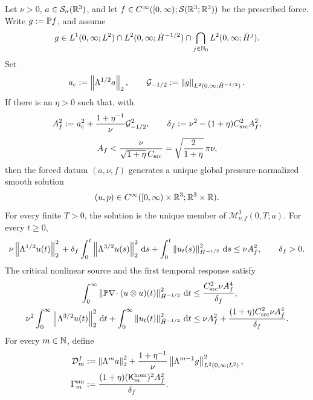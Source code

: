 \begin{theorem}
\label{f:thm:app-small-critical-global}
Let \(\nu>0\), \(a\in\mathcal S_\sigma(\mathbb R^3)\), and let
\(f\in C^\infty([0,\infty);\mathcal S(\mathbb R^3;\mathbb R^3))\) be the prescribed
force.  Write \(g:=\mathbb P f\), and assume
\begin{equation}
 g\in L^1(0,\infty;L^2)
 \cap L^2(0,\infty;\dot H^{-1/2})
 \cap\bigcap_{j\in\mathbb N_0}L^2(0,\infty;\dot H^j).
 \label{f:eq:app-small-force-class}
\end{equation}
Set
\[
 a_{\rm c}:=\left\lVert \Lambda^{1/2}a\right\rVert_2,
 \qquad
 \mathcal G_{-1/2}:=\left\lVert g\right\rVert_{L^2(0,\infty;\dot H^{-1/2})}.
\]
If there is an \(\eta>0\) such that, with
\[
 A_f^2:=a_{\rm c}^2
 +\frac{1+\eta^{-1}}{\nu}\mathcal G_{-1/2}^2,
 \qquad
 \delta_f:=\nu^2-(1+\eta)C_{\rm src}^2A_f^2,
\]
\begin{equation}
 A_f<\frac{\nu}{\sqrt{1+\eta}\,C_{\rm src}}
 =\sqrt{\frac{2}{1+\eta}}\,\pi\nu,
 \label{f:eq:app-critical-smallness}
\end{equation}
then the forced datum \((a,\nu,f)\) generates a unique global
pressure-normalized smooth solution
\[
 (u,p)\in C^\infty([0,\infty)\times\mathbb R^3;\mathbb R^3\times\mathbb R).
\]
For every finite \(T>0\), the solution is the unique member of
\(\mathscr M_{\nu,f}^3(0,T;a)\).
For every \(t\ge0\),
\begin{equation}
 \nu\left\lVert \Lambda^{1/2}u(t)\right\rVert_2^2
 {}+\delta_f\int_0^t\left\lVert \Lambda^{3/2}u(s)\right\rVert_2^2\,\mathrm d s
+\int_0^t\left\lVert u_t(s)\right\rVert_{\dot H^{-1/2}}^2\,\mathrm d s
 \le\nu A_f^2,
 \qquad \delta_f>0.
 \label{f:eq:app-critical-stock-action}
\end{equation}
The critical nonlinear source and the first temporal response satisfy
\begin{align}
 \int_0^\infty
 \left\lVert \mathbb P\nabla\!\cdot(u\otimes u)(t)\right\rVert_{\dot H^{-1/2}}^2\,\mathrm d t
 &\le \frac{C_{\rm src}^2\nu A_f^4}{\delta_f},
 \label{f:eq:app-small-critical-nonlinear-bound}\\
 \nu^2\int_0^\infty\left\lVert \Lambda^{3/2}u(t)\right\rVert_2^2\,\mathrm d t
 +\int_0^\infty\left\lVert u_t(t)\right\rVert_{\dot H^{-1/2}}^2\,\mathrm d t
 &\le \nu A_f^2
 +\frac{(1+\eta)C_{\rm src}^2\nu A_f^4}{\delta_f}.
 \label{f:eq:app-small-first-temporal-response}
\end{align}
For every \(m\in\mathbb N\), define
\begin{align}
 \mathcal D_m^f
 &:=\norm{\Lambda^ma}_2^2
 +\frac{1+\eta^{-1}}{\nu}
 \norm{\Lambda^{m-1}g}_{L^2(0,\infty;L^2)}^2,
 \notag\\
 \Gamma_m^{\rm sm}
 &:=\frac{(1+\eta)(\mathsf K_m^{\rm hom})^2A_f^2}{\delta_f}.

\end{align}
\end{theorem}
